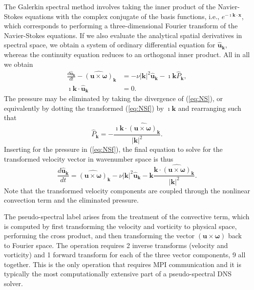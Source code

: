\documentclass[11pt, oneside]{article}
\begin{document}
The Galerkin spectral method involves taking the inner product of the Navier-Stokes equations with the complex conjugate of the basis functions, i.e., $e^{-\imath \bm{k} \cdot \bm{x}}$, which corresponds to performing a three-dimensional Fourier transform of the Navier-Stokes equations. If we also evaluate the analytical spatial derivatives in spectral space, we obtain a system of ordinary differential equation for $\hat{\bm{u}}_{\bm{k}}$, whereas the continuity equation reduces to an orthogonal inner product. All in all we obtain
\begin{align}
 \frac{d\hat{\bm{u}}_{\bm{k}}}{d t} - \widehat{( \bm{u} \times \bm{\omega})}_{\bm{k}} &= - \nu |\bm{k}|^2  \hat{\bm{u}}_{\bm{k}} - \imath \bm{k} \hat{P}_{\bm{k}}, \label{eq:NSf} \\
 \imath \bm{k} \cdot \hat{\bm{u}}_{\bm{k}} &= 0.
\end{align}
The pressure may be eliminated by taking the divergence of (\ref{eq:NS}), or equivalently by dotting the transformed (\ref{eq:NSf}) by $\imath \bm{k}$ and rearranging such that
\begin{equation}
\hat{P}_{\bm{k}} = - \frac{\imath\bm{k} \cdot \widehat{( \bm{u} \times \bm{\omega})}_{\bm{k}} }{|\bm{k}|^2}.
\label{eq:mod_pressure}
\end{equation}
Inserting for the pressure in (\ref{eq:NSf}), the final equation to solve for the transformed velocity vector in wavenumber space is thus
\begin{equation}
 \frac{d\hat{\bm{u}}_{\bm{k}}}{d t}  = \widehat{( \bm{u} \times \bm{\omega})}_{\bm{k}} - \nu |\bm{k}|^2  \hat{\bm{u}}_{\bm{k}} - \bm{k} \frac{\bm{k} \cdot \widehat{( \bm{u} \times \bm{\omega})}_{\bm{k}} }{|\bm{k}|^2}. \label{eq:NSfinal}
\end{equation}
Note that the transformed velocity components are coupled through the nonlinear convection term and the eliminated pressure.

The pseudo-spectral label arises from the treatment of the convective term, which is computed by first transforming the velocity and vorticity to physical space, performing the cross product, and then transforming the vector ${(\bm{u}  \times  \bm{\omega})}$  back to Fourier space. The operation requires 2 inverse transforms (velocity and vorticity) and 1 forward transform for each of the three vector components, 9 all together. This is the only operation that requires MPI communication and it is typically the most computationally extensive part of a pseudo-spectral DNS solver.
\end{document}
